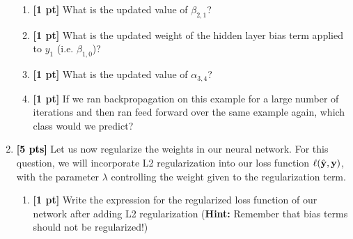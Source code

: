 \begin{enumerate}
     \begin{enumerate}
        \item \textbf{[1 pt]} What is the updated value of ${\beta}_{2,1}$?
        
        \begin{tcolorbox}[fit,height=1cm, width=2cm, blank, borderline={1pt}{-2pt}]
        \end{tcolorbox}
        
        \item \textbf{[1 pt]} What is the updated weight of the hidden layer bias term applied to $y_1$ (i.e. ${\beta}_{1,0}$)?
        
        \begin{tcolorbox}[fit,height=1cm, width=2cm, blank, borderline={1pt}{-2pt}]
        \end{tcolorbox}
        
        \item \textbf{[1 pt]} What is the updated value of ${\alpha}_{3,4}$?
        
        \begin{tcolorbox}[fit,height=1cm, width=2cm, blank, borderline={1pt}{-2pt}]
        \end{tcolorbox}
        
        \item \textbf{[1 pt]} If we ran backpropagation on this example for a large number of iterations and then ran feed forward over the same example again, which class would we predict?
        
        \begin{tcolorbox}[fit,height=1cm, width=2cm, blank, borderline={1pt}{-2pt}]
        \end{tcolorbox}
        
    \end{enumerate}

\clearpage
\item \textcolor{black}{\textbf{[5 pts]}} Let us now regularize the weights in our neural network. For this question, we will incorporate L2 regularization into our loss function $\ell(\hat{\mathbf{y}},\mathbf{y})$, with the parameter $\lambda$ controlling the weight given to the regularization term. 
\begin{enumerate}
    \item \textbf{[1 pt]} Write the expression for the regularized loss function of our network after adding L2 regularization (\textbf{Hint:} Remember that bias terms should not be regularized!) 
    \begin{tcolorbox}[fit,height=3cm, width=15cm, blank, borderline={1pt}{-2pt}]
    \end{tcolorbox}
        

\end{enumerate}
\end{enumerate}
